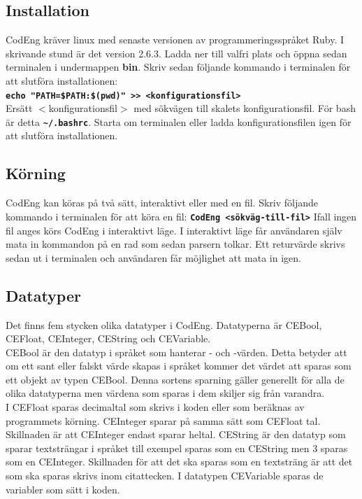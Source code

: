 \documentclass{article}
\begin{document}
\subsection{Installation}
CodEng kräver linux med senaste versionen av programmeringsspråket Ruby. I skrivande stund är det version 2.6.3. Ladda ner  till valfri plats och öppna sedan terminalen i undermappen \textbf{bin}. Skriv sedan följande kommando i terminalen för att slutföra installationen: \\ \newline
\texttt{\textbf{echo "PATH=\$PATH:\$(pwd)" >> <konfigurationsfil>}} \\ \newline
Ersätt \(<\)konfigurationsfil\(>\) med sökvägen till skalets konfigurationsfil. För bash är detta \texttt{\textbf{\textasciitilde/.bashrc}}. Starta om terminalen eller ladda konfigurationsfilen igen för att slutföra installationen.

\subsection{Körning}
CodEng kan köras på två sätt, interaktivt eller med en fil. Skriv följande kommando i terminalen för att köra en fil: \newline
\texttt{\textbf{CodEng <sökväg-till-fil>}} \newline
Ifall ingen fil anges körs CodEng i interaktivt läge. I interaktivt läge får användaren själv mata in kommandon på en rad som sedan parsern tolkar.
Ett returvärde skrivs sedan ut i terminalen och användaren får möjlighet att mata in igen.

\subsection{Datatyper}
Det finns fem stycken olika datatyper i CodEng. Datatyperna är CEBool, CEFloat, CEInteger, CEString och CEVariable. \\ \newline
CEBool är den datatyp i språket som hanterar - och -värden. Detta betyder att om ett sant eller falskt värde skapas i språket kommer det värdet att sparas som ett objekt av typen CEBool. Denna sortens sparning gäller generellt för alla de olika datatyperna men värdena som sparas i dem skiljer sig från varandra.
\\ \newline I CEFloat sparas decimaltal som skrivs i koden eller som beräknas av programmets körning.
CEInteger sparar på samma sätt som CEFloat tal. Skillnaden är att CEInteger endast sparar heltal. 
CEString är den datatyp som sparar textsträngar i språket till exempel sparas  som en CEString men 3 sparas som en CEInteger. Skillnaden för att det ska sparas som en textsträng är att det som ska sparas skrivs inom citattecken. I datatypen CEVariable sparas de variabler som sätt i koden.
\end{document}
